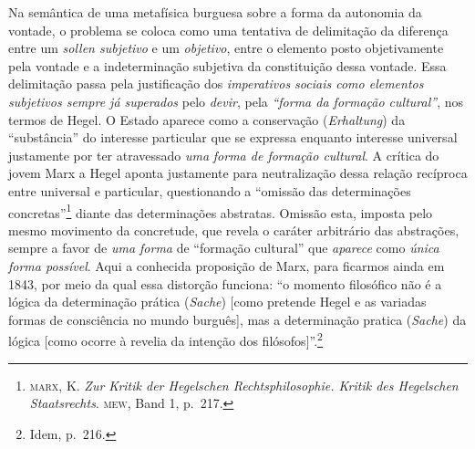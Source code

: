 Na semântica de uma metafísica burguesa sobre a forma da autonomia da
vontade, o problema se coloca como uma tentativa de delimitação da
diferença entre um \emph{sollen subjetivo} e um \emph{objetivo}, entre o
elemento posto objetivamente pela vontade e a indeterminação subjetiva
da constituição dessa vontade. Essa delimitação passa pela justificação
dos \emph{imperativos sociais como elementos subjetivos sempre já
superados} pelo \emph{devir}, pela \emph{``forma da formação
cultural''}, nos termos de Hegel. O Estado aparece como a conservação
(\emph{Erhaltung}) da ``substância'' do interesse particular que se
expressa enquanto interesse universal justamente por ter atravessado
\emph{uma} \emph{forma de formação cultural}. A crítica do jovem Marx a
Hegel aponta justamente para neutralização dessa relação recíproca entre
universal e particular, questionando a ``omissão das determinações
concretas''\footnote{\textsc{marx}, K. \emph{Zur Kritik der Hegelschen
  Rechtsphilosophie. Kritik des Hegelschen Staatsrechts}. \textsc{mew},
  Band 1, p.~217.} diante das determinações abstratas. Omissão esta,
imposta pelo mesmo movimento da concretude, que revela o caráter
arbitrário das abstrações, sempre a favor de \emph{uma forma} de
``formação cultural'' que \emph{aparece} como \emph{única forma
possível}. Aqui a conhecida proposição de Marx, para ficarmos ainda em
1843, por meio da qual essa distorção funciona: ``o momento filosófico
não é a lógica da determinação prática (\emph{Sache}) {[}como pretende
Hegel e as variadas formas de consciência no mundo burguês{]}, mas a
determinação pratica (\emph{Sache}) da lógica {[}como ocorre à revelia
da intenção dos filósofos{]}''.\footnote{Idem, p.~216.}

